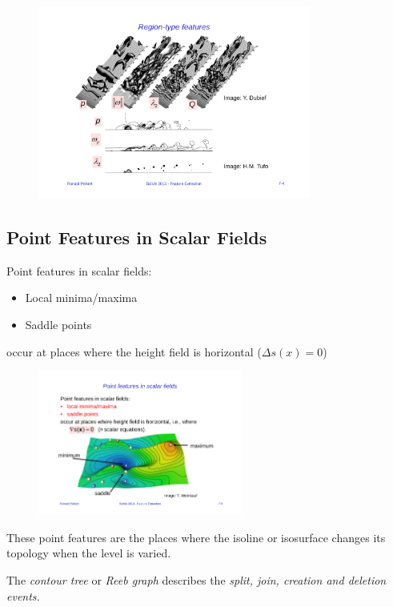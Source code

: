 \begin{figure}[H]
\centering
\includegraphics[width=0.8\textwidth]{img/07_region_features}
\end{figure}

\subsection{Point Features in Scalar Fields}
Point features in scalar fields:
\begin{itemize}
    \item Local minima/maxima
    \item Saddle points
\end{itemize}
occur at places where the height field is horizontal ($\Delta s(x)=0$)
\begin{figure}[H]
\centering
\includegraphics[width=0.6\textwidth]{img/07_scalar_features}
\end{figure}

These point features are the places where the isoline or isosurface changes its topology when the level is varied. 

The \emph{contour tree} or \emph{Reeb graph} describes the \em split, join, creation \em and \em deletion events\em.

